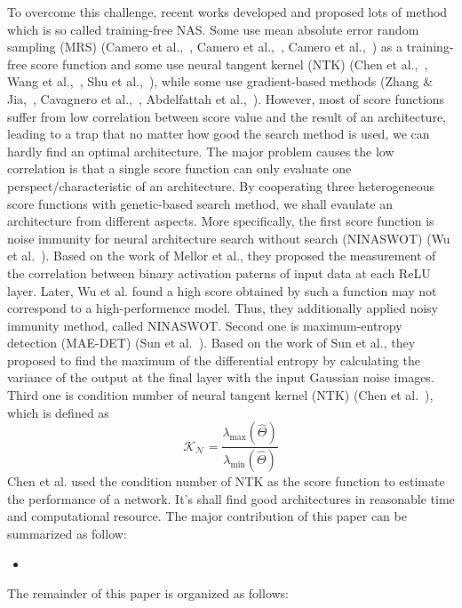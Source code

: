 \documentclass[conference]{IEEEtran}
\begin{document}
    To overcome this challenge, recent works developed and proposed lots 
    of method which is so called training-free NAS. Some use mean absolute 
    error random sampling (MRS) (Camero et al.,\ \cite{https://doi.org/10.48550/arxiv.1805.07159}, 
    Camero et al.,\ \cite{Camero_2021}, Camero et al.,\ \cite{https://doi.org/10.48550/arxiv.2106.15295}) 
    as a training-free score function and some use neural tangent kernel 
    (NTK) (Chen et al.,\ \cite{https://doi.org/10.48550/arxiv.2102.11535}, 
    Wang et al.,\ \cite{https://doi.org/10.48550/arxiv.2203.09137}, 
    Shu et al.,\ \cite{https://doi.org/10.48550/arxiv.2109.00817}), while 
    some use gradient-based methods (Zhang \& Jia,\ \cite{https://doi.org/10.48550/arxiv.2110.08616}, 
    Cavagnero et al.,\ \cite{https://doi.org/10.48550/arxiv.2207.05135}, 
    Abdelfattah et al.,\ \cite{https://doi.org/10.48550/arxiv.2101.08134}).
    However, most of score functions suffer from low correlation between 
    score value and the result of an architecture, leading to a trap that 
    no matter how good the search method is used, we can hardly find an 
    optimal architecture.
    The major problem causes the low correlation is that a single score 
    function can only evaluate one perspect/characteristic of an architecture.
    By cooperating three heterogeneous score functions with genetic-based 
    search method, we shall evaulate an architecture from different aspects. 
    More specifically, the first score function is noise immunity for neural 
    architecture search without search (NINASWOT) (Wu et al.\ \cite{10.1145/3491396.3506510}). 
    Based on the work of Mellor et al., they proposed the measurement of 
    the correlation between binary activation paterns of input data at each 
    ReLU layer. Later, Wu et al. found a high score obtained by such a 
    function may not correspond to a high-performence model. Thus, they 
    additionally applied noisy immunity method, called NINASWOT. Second one 
    is maximum-entropy detection (MAE-DET) (Sun et al.\ \cite{https://doi.org/10.48550/arxiv.2111.13336}). 
    Based on the work of Sun et al., they proposed to find the maximum of 
    the differential entropy by calculating the variance of the output at 
    the final layer with the input Gaussian noise images. Third one is 
    condition number of  neural tangent kernel (NTK) (Chen et al.\ \cite{https://doi.org/10.48550/arxiv.2102.11535}), 
    which is defined as 
    \begin{equation}
        \mathcal{K_N}=\frac{\lambda_{\textrm{max}}(\hat\Theta)}{\lambda_{\textrm{min}}(\hat\Theta)}
    \end{equation}
    Chen et al. used the condition number of NTK as the score function to estimate the performance of a network.
    It's shall find good architectures in reasonable time and computational resource.
    The major contribution of this paper can be summarized as follow:
    \begin{itemize}
        \item 
    \end{itemize}

    The remainder of this paper is organized as follows:

    
    
\end{document}

